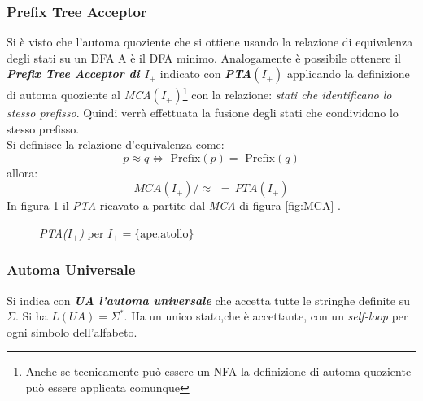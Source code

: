 \subsubsection{Prefix Tree Acceptor}
Si è visto che l'automa quoziente che si ottiene usando la relazione di equivalenza degli stati su un \ac{DFA} A è il \ac{DFA} minimo. Analogamente è possibile ottenere il \textit{\textbf{Prefix Tree Acceptor di $I_+$}} indicato con \textit{\textbf{PTA$(I_+)$}} applicando la definizione di automa quoziente al \textit{MCA$(I_+)$}\footnote{Anche se tecnicamente può essere un \ac{NFA} la definizione di automa quoziente può essere applicata comunque} con la relazione: \textit{stati che identificano lo stesso prefisso}. Quindi verrà effettuata la fusione degli stati che condividono lo stesso prefisso.\\
Si definisce la relazione d'equivalenza come:
\begin{equation*}
p \approx q \Leftrightarrow \text{ Prefix}(p) = \text{ Prefix}(q)
\end{equation*}
allora:
\begin{equation*}
MCA(I_+)/\!\!\approx \,\,=\, PTA(I_+)
\end{equation*}
In figura \ref{fig:PTA} il \textit{PTA} ricavato a partite dal \textit{MCA} di figura \ref{fig:MCA} .
\begin{figure}[htp]
\centering
{}
\caption[Prefix Tre Acceptor]{\textit{PTA($I_+$)} per $I_+=\{\text{ape,atollo}\}$}
\label{fig:PTA}
\end{figure}

\subsubsection{Automa Universale}
Si indica con \textit{\textbf{UA l'automa universale}} che accetta tutte le stringhe definite su $\Sigma$. Si ha $L(UA) = \Sigma^{*}$. Ha un unico stato,che è accettante, con un \textit{self-loop} per ogni simbolo dell'alfabeto.

